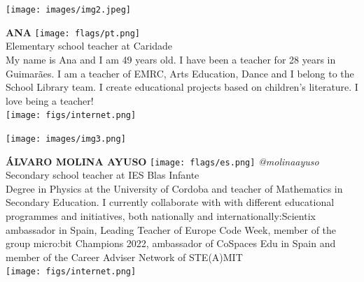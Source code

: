 \documentclass[11pt]{article}
\begin{document}
\noindent
\begin{minipage}{0.3\textwidth}
\centering
\texttt{[image: images/img2.jpeg]}
\end{minipage}
\hfill
\begin{minipage}{0.6\textwidth}\raggedright
\color{color1}\uppercase{\textbf{Ana }}
\color{color2}\hspace{0.2cm}\texttt{[image: flags/pt.png]}
\\
Elementary school teacher at Caridade\\
{\footnotesize My name is Ana and I am 49 years old. I have been a teacher for 28 years in Guimarães. I am a teacher of EMRC, Arts Education, Dance and I belong to the School Library team. I create educational projects based on children's literature.
I love being a teacher!}\\
\texttt{[image: figs/internet.png]}
\end{minipage}
\newline\newline\newline

\noindent
\begin{minipage}{0.3\textwidth}
\centering
\texttt{[image: images/img3.png]}
\end{minipage}
\hfill
\begin{minipage}{0.6\textwidth}\raggedright
\color{color1}\uppercase{\textbf{Álvaro Molina Ayuso}}
\color{color2}\hspace{0.2cm}\texttt{[image: flags/es.png]}
\hspace{0.2cm}\textit{@molinaayuso}
\\
Secondary school teacher at IES Blas Infante\\
{\footnotesize Degree in Physics at the University of Cordoba and teacher of Mathematics in Secondary Education. I currently collaborate with with different educational programmes and initiatives, both nationally and internationally:Scientix ambassador in Spain, Leading Teacher of Europe Code Week, member of the group micro:bit Champions 2022, ambassador of CoSpaces Edu in Spain and member of the Career Adviser Network of STE(A)MIT}\\
\texttt{[image: figs/internet.png]}
\end{minipage}
\newline\newline\newline
\end{document}
